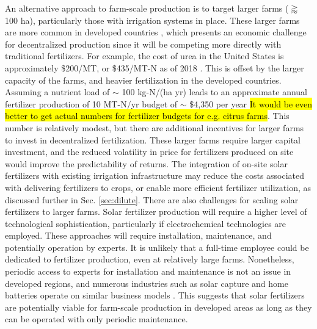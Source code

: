 An alternative approach to farm-scale production is to target larger farms ($\gtrapprox$ 100 ha), particularly those with irrigation systems in place. These larger farms are more common in developed countries \cite{Lowder_2016}, which presents an economic challenge for decentralized production since it will be competing more directly with traditional fertilizers. For example, the cost of urea in the United States is approximately \$200/MT, or \$435/MT-N as of 2018 \needcite. This is offset by the larger capacity of the farms, and heavier fertilization in the developed countries. Assuming a nutrient load of $\sim$ 100 kg-N/(ha yr) leads to an approximate annual fertilizer production of 10 MT-N/yr budget of $\sim$ \$4,350 per year \hl{It would be even better to get actual numbers for fertilizer budgets for e.g. citrus farms}. This number is relatively modest, but there are additional incentives for larger farms to invest in decentralized fertilization. These larger farms require larger capital investment, and the reduced volatility in price for fertilizers produced on site would improve the predictability of returns. The integration of on-site solar fertilizers with existing irrigation infrastructure may reduce the costs associated with delivering fertilizers to crops, or enable more efficient fertilizer utilization, as discussed further in Sec. \ref{sec:dilute}. There are also challenges for scaling solar fertilizers to larger farms. Solar fertilizer production will require a higher level of technological sophistication, particularly if electrochemical technologies are employed. These approaches will require installation, maintenance, and potentially operation by experts. It is unlikely that a full-time employee could be dedicated to fertilizer production, even at relatively large farms. Nonetheless, periodic access to experts for installation and maintenance is not an issue in developed regions, and numerous industries such as solar capture and home batteries operate on similar business models \needcite. This suggests that solar fertilizers are potentially viable for farm-scale production in developed areas as long as they can be operated with only periodic maintenance.

